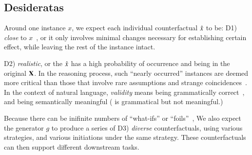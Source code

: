 \subsection{Desideratas}
Around one instance $x$, we expect each individual counterfactual $\hat{x}$ to be: 
D1) \emph{close} to $x$~\cite{pearl2018causal}, or it only involves minimal changes necessary for establishing certain effect, while leaving the rest of the instance intact.

D2) \emph{realistic}, or the $\hat{x}$ has a high probability of occurrence and being in the original $\mathbf{X}$.
In the reasoning process, such ``nearly occurred'' instances are deemed more critical than those that involve rare assumptions and strange coincidences~\cite{kahneman}.
In the context of natural language, \emph{validity} means being grammatically correct~\cite{morris2020textattack}, and being semantically meaningful (\eg {} is grammatical but not meaningful.) 

Because there can be inifinite numbers of ``what-ifs'' or ``foils''~\cite{pearl2018causal, kahneman}, We also expect the generator $g$ to produce a series of D3) \emph{diverse} counterfactuals, using various strategies, and various initiations under the same strategy.
These counterfactuals can then support different downstream tasks. 






